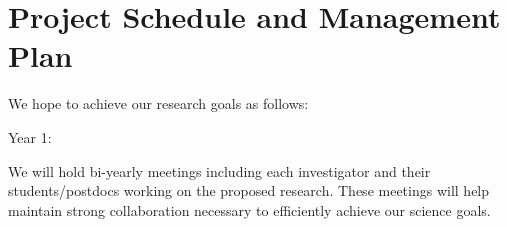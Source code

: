 \section{Project Schedule and Management Plan}

We hope to achieve our research goals as follows:

Year 1: 

We will  hold bi-yearly meetings including each investigator and their students/postdocs working on the proposed research. These meetings will help maintain strong collaboration necessary to efficiently achieve our science goals.
